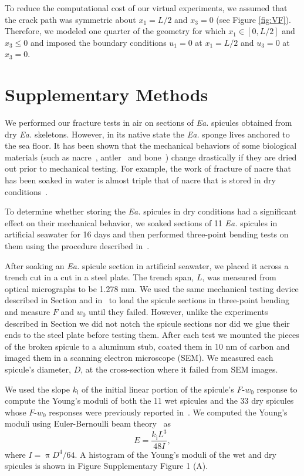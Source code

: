 \documentclass[12pt,onecolumn]{article}
\makeatletter
\DeclareRobustCommand*{\nameref}[1]{%
      \emph{\myorg@nameref{#1}}%
    }%
\newcommand{\EA}{\textit{Ea.\@}\xspace}
\makeatother
\begin{document}
\begin{bibunit}
To reduce the computational cost of our virtual experiments, we assumed that the crack path was symmetric about $x_1 = L/2$ and $x_3 = 0$ (see Figure \ref{fig:VF}). Therefore, we modeled one quarter of the geometry for which $x_1 \in [0,L/2]$ and $x_3\leq 0$ and imposed the boundary conditions $u_1 = 0$ at $x_1 = L/2$ and $u_3 = 0$ at $x_3 = 0$.

\section*{Supplementary Methods}
\label{sec:hyd}

We performed our fracture tests in air on sections of \EA spicules obtained from dry \EA skeletons. However, in its native state the \EA sponge lives anchored to the sea floor. It has been shown that the mechanical behaviors of some biological materials (such as nacre~\cite{barthelat2007mechanics}, antler~\cite{chen2008fracture} and bone~\cite{chen2008fracture}) change drastically if they are dried out prior to mechanical testing. For example, the work of fracture of nacre that has been soaked in water is almost triple that of nacre that is stored in dry conditions~\cite{jackson1988}.

To determine whether storing the \EA spicules in dry conditions had a significant effect on their mechanical behavior,  we soaked sections of 11 \EA spicules in artificial seawater for 16 days and then performed three-point bending tests on them using the procedure described in~\cite{monn2017enhanced}. 

After soaking an \EA spicule section in artificial seawater, we placed it across a trench cut in a cut in a steel plate. The trench span, $L$, was measured from optical micrographs to be 1.278 mm. We used the same mechanical testing device described in Section \nameref{sec:res} and in~\cite{monn2017enhanced} to load the spicule sections in three-point bending and measure $F$ and $w_0$ until they failed. However, unlike the experiments described in Section \nameref{sec:res} we did not notch the spicule sections nor did we glue their ends to the steel plate before testing them. After each test we mounted the pieces of the broken spicule to a aluminum stub, coated them in 10 nm of carbon and imaged them in a scanning electron microscope (SEM). We measured each spicule's diameter, $D$, at the cross-section where it failed from SEM images.

We used the slope $k_\mathrm{i}$ of the initial linear portion of the spicule's $F$-$w_0$ response to compute the Young's moduli of both the 11 wet spicules and the 33 dry spicules whose $F$-$w_0$ responses were previously reported in~\cite{monn2017enhanced}. We computed the Young's moduli using Euler-Bernoulli beam theory~\cite{gere1997mechanics} as
%
\begin{equation}
\label{eq0}
E=\frac{k_\mathrm{i} L^3}{48 I},
\end{equation}
%
where $I=\uppi D^4/64$. A histogram of the Young's moduli of the wet and dry spicules is shown in Figure Supplementary Figure 1 (A). 


\end{bibunit}
\end{document}
